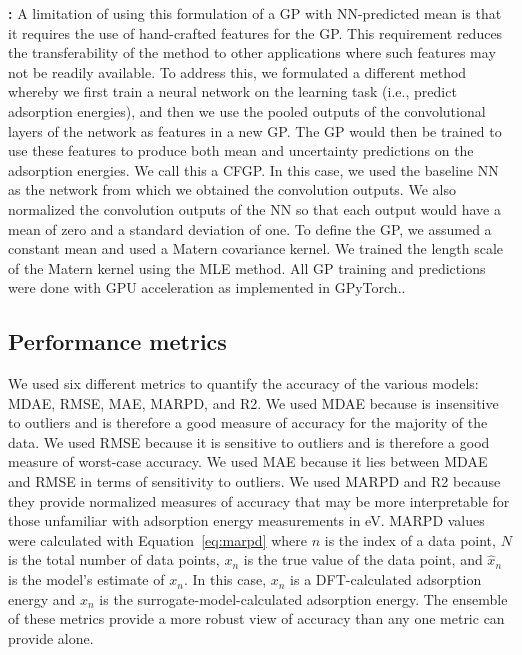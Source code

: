 \documentclass[]{achemso}
\begin{document}
\textbf{:}
A limitation of using this formulation of a \gls{GP} with \gls{NN}-predicted mean is that it requires the use of hand-crafted features for the \gls{GP}.
This requirement reduces the transferability of the method to other applications where such features may not be readily available.
To address this, we formulated a different method whereby we first train a neural network on the learning task (i.e., predict adsorption energies), and then we use the pooled outputs of the convolutional layers of the network as features in a new \gls{GP}.
The \gls{GP} would then be trained to use these features to produce both mean and uncertainty predictions on the adsorption energies.
We call this a \gls{CFGP}.
In this case, we used the baseline \gls{NN} as the network from which we obtained the convolution outputs.
We also normalized the convolution outputs of the \gls{NN} so that each output would have a mean of zero and a standard deviation of one.
To define the \gls{GP}, we assumed a constant mean and used a Matern covariance kernel.
We trained the length scale of the Matern kernel using the \gls{MLE} method.
All \gls{GP} training and predictions were done with GPU acceleration as implemented in GPyTorch.\cite{Gardner2018}.


\subsection{Performance metrics}

We used six different metrics to quantify the accuracy of the various models:  \gls{MDAE}, \gls{RMSE}, \gls{MAE}, \gls{MARPD}, and \gls{R2}.
We used \gls{MDAE} because is insensitive to outliers and is therefore a good measure of accuracy for the majority of the data.
We used \gls{RMSE} because it is sensitive to outliers and is therefore a good measure of worst-case accuracy.
We used \gls{MAE} because it lies between \gls{MDAE} and \gls{RMSE} in terms of sensitivity to outliers.
We used \gls{MARPD} and \gls{R2} because they provide normalized measures of accuracy that may be more interpretable for those unfamiliar with adsorption energy measurements in \gls{eV}.
\gls{MARPD} values were calculated with Equation~\ref{eq:marpd} where $n$ is the index of a data point, $N$ is the total number of data points, $x_n$ is the true value of the data point, and $\hat{x}_n$ is the model's estimate of $x_n$.
In this case, $x_n$ is a DFT-calculated adsorption energy and $\hat{x}_n$ is the surrogate-model-calculated adsorption energy.
The ensemble of these metrics provide a more robust view of accuracy than any one metric can provide alone.
\end{document}
